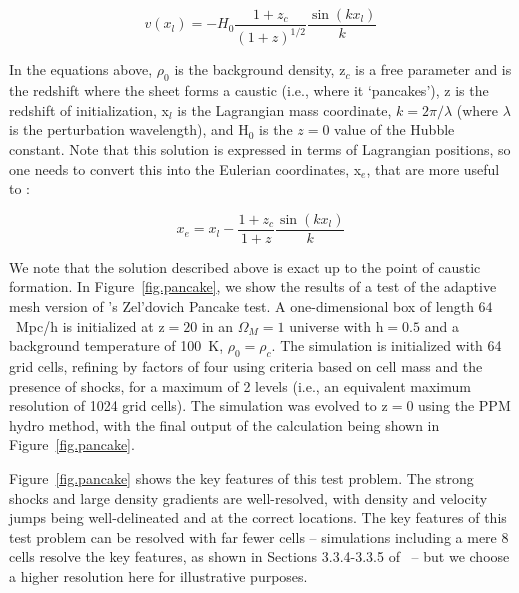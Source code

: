 \begin{equation}
v(x_l) = -H_0 \frac{1 + z_c}{(1+z)^{1/2}} \frac{\sin(k x_l)}{k}
\end{equation}

In the equations above, $\rho_0$ is the background density, z$_c$ is a
free parameter and is the redshift where the sheet forms a caustic
(i.e., where it `pancakes'), z is the redshift of initialization, x$_l$ is the
Lagrangian mass coordinate, $k = 2 \pi / \lambda$ (where $\lambda$ is
the perturbation wavelength), and H$_0$ is the $z = 0$ value of the
Hubble constant.  Note that this solution is expressed in terms of
Lagrangian positions, so one needs to convert this into the Eulerian
coordinates, x$_e$, that are more useful to \enzo:

\begin{equation}
x_e = x_l - \frac{1 + z_c}{1 + z} \frac{\sin(k x_l)}{k}
\end{equation}

We note that the solution described above is exact up to the point of
caustic formation.  In Figure~\ref{fig.pancake}, we show the results
of a test of the adaptive mesh version of \enzo's Zel'dovich Pancake test.  A
one-dimensional box of length $64$~Mpc/h is initialized at z$ = 20$ in
an $\Omega_M = 1$ universe with h$ = 0.5$ and a background temperature
of 100~K, $\rho_0 = \rho_c$.  The simulation is initialized with 64
grid cells, refining by factors of four using criteria based on cell
mass and the presence of shocks, for a maximum of 2 levels (i.e., an
equivalent maximum resolution of 1024 grid cells).  The simulation was
evolved to z$ = 0$ using the PPM hydro method, with the final output
of the calculation being shown in Figure~\ref{fig.pancake}.

Figure~\ref{fig.pancake} shows the key features of this test problem.
The strong shocks and large density gradients are well-resolved, with
density and velocity jumps being well-delineated and at the correct locations.  The key features of
this test problem can be resolved with far fewer cells -- simulations
including a mere 8 cells resolve the key features, as shown in
Sections 3.3.4-3.3.5 of~\citet{1996PhDT........80B} -- but we choose a
higher resolution here for illustrative purposes.

